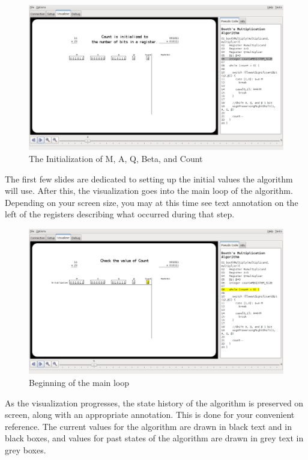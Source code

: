 \documentclass{article}
\begin{document}
\pagebreak
\begin{figure}[h]
\centering
\includegraphics[scale=0.3]{initreg.pdf}
\caption{The Initialization of M, A, Q, Beta, and Count}
\end{figure}

The first few slides are dedicated to setting up the initial values the algorithm will use.
After this, the visualization goes into the main loop of the algorithm.
Depending on your screen size, you may at this time see text annotation on the left of the registers describing what occurred during that step.

\begin{figure}[h]
\centering
\includegraphics[scale=0.3]{looptop.pdf}
\caption{Beginning of the main loop}
\end{figure}

As the visualization progresses, the state history of the algorithm is preserved on screen, along with an appropriate annotation.
This is done for your convenient reference.
The current values for the algorithm are drawn in black text and in black boxes, and values for past states of the algorithm are drawn in grey text in grey boxes.
\end{document}
